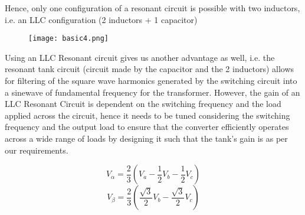 Hence, only one configuration of a resonant circuit is possible with two inductors, i.e. an LLC configuration (2 inductors + 1 capacitor)
\begin{figure}[ht]
    \centering
    \texttt{[image: basic4.png]}
    \label{fig:basic4}
\end{figure}

Using an LLC Resonant circuit gives us another advantage as well, i.e. the resonant tank circuit (circuit made by the capacitor and the 2 inductors) allows for filtering of the square wave harmonics generated by the switching circuit into a sinewave of fundamental frequency for the transformer.
However, the gain of an LLC Resonant Circuit is dependent on the switching frequency and the load applied across the circuit, hence it needs to be tuned considering the switching frequency and the output load to ensure that the converter efficiently operates across a wide range of loads by designing it such that the tank’s gain is as per our requirements.

\begin{equation*}
    V_\alpha = \frac{2}{3}(V_a - \frac{1}{2} V_b - \frac{1}{2} V_c)
\end{equation*}
\begin{equation*}
    V_\beta = \frac{2}{3}(\frac{\sqrt{3}}{2} V_b - \frac{\sqrt{3}}{2} V_c)
\end{equation*}
